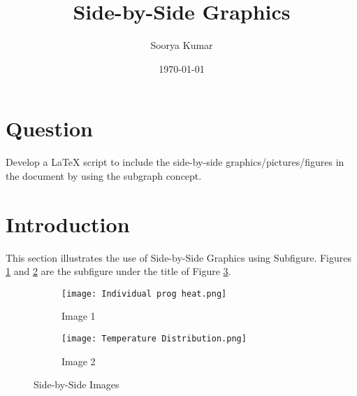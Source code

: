 \documentclass{article}
\title{\LARGE \textbf{Side-by-Side Graphics}}
\author{Soorya Kumar}
\date{\today}
\begin{document}
	\maketitle
	
	\section*{Question}
		{\large Develop a LaTeX script to include the side-by-side graphics/pictures/figures in the document by using the
			subgraph concept.}\\
		
	\section{Introduction}
		\large This section illustrates the use of Side-by-Side Graphics using Subfigure. Figures \ref{fig:image1} and \ref{fig:image2} are the subfigure under the title of Figure \ref{fig:sidebyside}.
		
		\begin{figure}[h!]
   			 \centering
    		\begin{subfigure}[b]{0.45\textwidth}
       			 \texttt{[image: Individual prog heat.png]}
       			 \caption{Image 1}
       			 \label{fig:image1}
   			 \end{subfigure}
   			 \begin{subfigure}[b]{0.45\textwidth}
       				 \texttt{[image: Temperature Distribution.png]}
       				 \caption{Image 2}
       				 \label{fig:image2}
    		\end{subfigure}
    		\caption{Side-by-Side Images}
   			 \label{fig:sidebyside}
   			 
		\end{figure}
\end{document}
